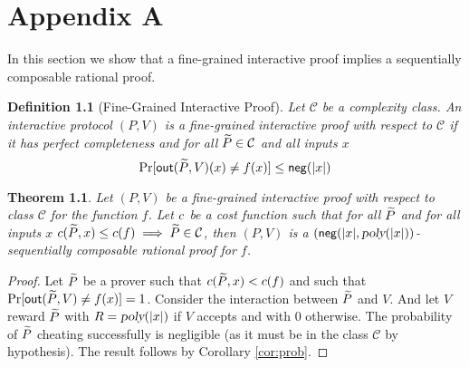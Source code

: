 \chapter{Appendix A}

\newtheorem*{theorem*}{Theorem}
\newtheorem*{definition*}{Definition}

In this section we show that a fine-grained interactive proof implies a sequentially composable rational proof.

\def\sndCls{\mathcal{C}}

\begin{definition*}[Fine-Grained Interactive Proof]
Let $\sndCls$ be a complexity class. An interactive protocol $(P, V)$ is a fine-grained interactive proof with respect to $\sndCls$ if it has perfect completeness and for all $\disP \in \sndCls$ and all inputs $x$
$$ \Pr[\mathsf{out}(\widetilde{P},V)(x) \not = f(x)] \leq  \mathsf{neg}(|x|)$$
\end{definition*}

\begin{theorem*}
Let $(P, V)$ be a fine-grained interactive proof with respect to class $\sndCls$ for the function $f$. Let $c$ be a cost function such that for all $\widetilde{P}$ and for all inputs $x$ $\cost(\disP, x) \leq \cost(f) \implies \disP \in \sndCls$, then $(P, V)$ is a $(\mathsf{neg}(|x|, {\textsl{poly}}(|x|))$-sequentially composable rational proof for $f$.
\end{theorem*}
\begin{proof}
	Let $\widetilde{P}$ be a prover such that $c(\widetilde{P}, x) < c(f)$ and such that $\Pr[\mathsf{out}(\widetilde{P}, V) \not = f(x)] = 1$. Consider the interaction between $\widetilde{P}$ and $V$. And let $V$ reward $\widetilde{P}$ with $R = {\textsl{poly}}(|x|)$ if $V$ accepts and with $0$ otherwise.
	The probability of $\widetilde{P}$ cheating successfully is negligible (as it must be in the class $\sndCls$ by hypothesis).  The result follows by Corollary \ref{cor:prob}.
\end{proof}
